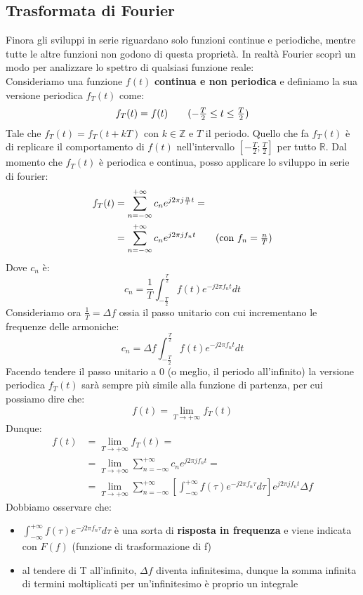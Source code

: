 \subsection{Trasformata di Fourier}
Finora gli sviluppi in serie riguardano solo funzioni continue e periodiche, mentre tutte le altre funzioni non godono di 
questa proprietà. In realtà Fourier scoprì un modo per analizzare lo spettro di qualsiasi funzione reale:\\
Consideriamo una funzione $f(t)$ \textbf{continua e non periodica} e definiamo la sua versione periodica $f_T(t)$ come:
\begin{equation*}
    f_T(t) = f(t) \tag{$-\frac{T}{2} \leq t \leq \frac{T}{2}$}
\end{equation*}
Tale che $f_T(t) = f_T(t + kT)$ con $k \in \mathbb{Z}$ e $T$ il periodo. Quello che fa $f_T(t)$ è di replicare il comportamento
di $f(t)$ nell'intervallo $[-\frac{T}{2}; \frac{T}{2}]$ per tutto $\mathbb{R}$. Dal momento che $f_T(t)$ è periodica e continua, posso 
applicare lo sviluppo in serie di fourier:
\begin{align*}
    f_T(t) &= \sum_{n = -\infty}^{+\infty} c_n e^{j2 \pi j \frac{n}{T}t} = \\
           &= \sum_{n = -\infty}^{+\infty} c_n e^{j2 \pi j f_n t} \tag{con $f_n = \frac{n}{T}$}
\end{align*}
Dove $c_n$ è:
\begin{equation*}
    c_n = \frac{1}{T} \int_{-\frac{T}{2}}^{\frac{T}{2}} f(t) e^{-j2 \pi f_n t}dt
\end{equation*}
Consideriamo ora $\frac{1}{T} = \Delta f$ ossia il passo unitario con cui incrementano le frequenze delle armoniche:
\begin{equation*}
    c_n = \Delta f \int_{-\frac{T}{2}}^{\frac{T}{2}} f(t) e^{-j2 \pi f_n t}dt
\end{equation*}
Facendo tendere il passo unitario a 0 (o meglio, il periodo all'infinito) la versione periodica $f_T(t)$ sarà sempre più
simile alla funzione di partenza, per cui possiamo dire che:
\begin{equation}
    f(t) = \lim_{T \to +\infty} f_T(t)
\end{equation}
Dunque:
\begin{align*}
    f(t) &= \lim_{T \to +\infty} f_T(t) =\\
         &= \lim_{T \to +\infty} \sum_{n = -\infty}^{+\infty} c_n e^{j2 \pi j f_n t} =\\
         &= \lim_{T \to +\infty} \sum_{n = -\infty}^{+\infty} \left[\int_{-\infty}^{+\infty} f(\tau) e^{-j2 \pi f_n \tau}d\tau\right] e^{j2 \pi j f_n t} \Delta f
\end{align*}
Dobbiamo osservare che:
\begin{itemize}
    \item $\int_{-\infty}^{+\infty} f(\tau) e^{-j2 \pi f_n \tau}d\tau$ è una sorta di \textbf{risposta in frequenza} e viene indicata con $F(f)$ (funzione di trasformazione di f)
    \item al tendere di T all'infinito, $\Delta f$ diventa infinitesima, dunque la somma infinita di termini moltiplicati per un'infinitesimo è proprio un integrale
\end{itemize}
